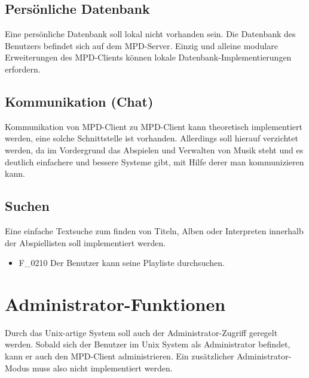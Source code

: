 \subsection{Persönliche Datenbank}
Eine persönliche Datenbank soll lokal nicht vorhanden sein. Die Datenbank des Benutzers befindet sich auf dem MPD-Server.
Einzig und alleine modulare Erweiterungen des MPD-Clients können lokale Datenbank-Implementierungen erfordern.
\subsection{Kommunikation (Chat)}
Kommunikation von MPD-Client zu MPD-Client kann theoretisch implementiert werden, eine solche Schnittstelle ist vorhanden.
Allerdings soll hierauf verzichtet werden, da im Vordergrund das Abspielen und Verwalten von Musik steht und es deutlich
einfachere und bessere Systeme gibt, mit Hilfe derer man kommunizieren kann.
\subsection{Suchen}
Eine einfache Textsuche zum finden von Titeln, Alben oder Interpreten innerhalb der Abspiellisten soll implementiert werden.
\begin{itemize}
	\item F\_0210 Der Benutzer kann seine Playliste durchsuchen.
\end{itemize}
\section{Administrator-Funktionen}
Durch das Unix-artige System soll auch der Administrator-Zugriff geregelt werden. Sobald sich der Benutzer im Unix System
als Administrator befindet, kann er auch den MPD-Client administrieren. Ein zusätzlicher Administrator-Modus muss also
nicht implementiert werden.
